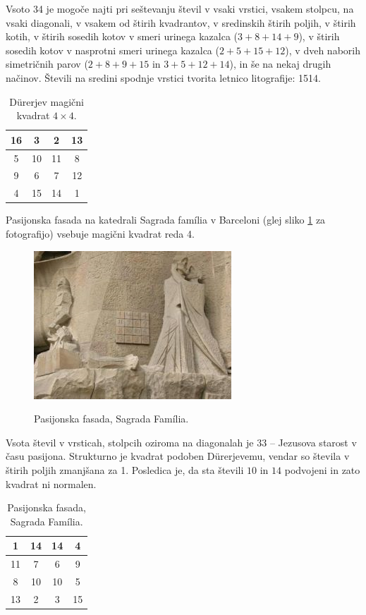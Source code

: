 \documentclass[a4paper,12pt]{article}
\theoremstyle{definition}
\newenvironment{magic}[3]{
    \begin{table}[h]
        \centering
        \caption{#1}
        \label{#3}
        \large
        \begin{tabular}{|*{#2}{c|}}
            \hline
            }
            {
        \end{tabular}
        \normalsize
    \end{table}
}
\begin{document}
Vsoto 34 je mogoče najti pri seštevanju števil v vsaki vrstici, vsakem stolpcu, na vsaki diagonali, v vsakem od štirih kvadrantov, v sredinskih štirih poljih, v štirih kotih, v štirih sosedih kotov v smeri urinega kazalca ($3+8+14+9$), v štirih sosedih kotov v nasprotni smeri urinega kazalca ($2+5+15+12$), v dveh naborih simetričnih parov ($2+8+9+15$ in $3+5+12+14$), in še na nekaj drugih načinov. Števili na sredini spodnje vrstici tvorita letnico litografije: 1514.

\begin{magic}{Dürerjev magični kvadrat $4\times 4$.}{4}{table:durer}
        16 &  3 &  2 & 13 \\\hline
         5 & 10 & 11 &  8 \\\hline
         9 &  6 &  7 & 12 \\\hline
         4 & 15 & 14 &  1 \\\hline
\end{magic}

Pasijonska fasada na katedrali Sagrada família v Barceloni (glej sliko \ref{fig:sagrada} za fotografijo) vsebuje magični kvadrat reda 4.

\begin{figure}
    \centering
    \caption{Pasijonska fasada, Sagrada Família.}
    \includegraphics{img/sagrada.png}
    \label{fig:sagrada}
\end{figure}

Vsota števil v vrsticah, stolpcih oziroma na diagonalah je $33$ -- Jezusova starost v času pasijona. Strukturno je kvadrat podoben Dürerjevemu, vendar so števila v štirih poljih zmanjšana za 1. Posledica je, da sta števili $10$ in $14$ podvojeni in zato kvadrat ni normalen.

\begin{magic}{Pasijonska fasada, Sagrada Família.}{4}{table:sagrada}
         1 & 14 & 14 &  4 \\\hline
        11 &  7 &  6 &  9 \\\hline
         8 & 10 & 10 &  5 \\\hline
        13 &  2 &  3 & 15 \\\hline
\end{magic}
\end{document}
